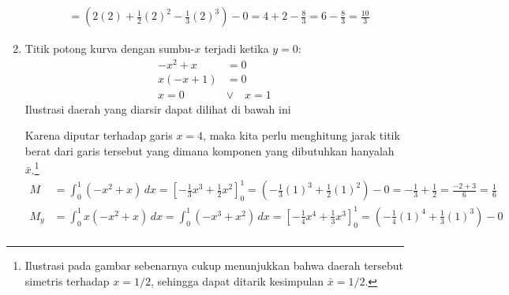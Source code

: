 \documentclass[11pt,openany,a4paper]{article}
\newcommand{\AxisRotator}[1][rotate=0]{%
    \tikz [x=0.25cm,y=0.60cm,line width=0.15ex,-stealth,#1,solid] \draw (0,0) arc (330:30:0.5 and 0.5);%
    }
\begin{document}
\begin{enumerate}
\begin{align*}
            &= \left( 2(2) + \frac{1}{2}(2)^2 - \frac{1}{3}(2)^3 \right) - 0 = 4 + 2 - \frac{8}{3} = 6 - \frac{8}{3} = \boxed{\frac{10}{3}}
        \end{align*}
        \item Titik potong kurva dengan sumbu-\( x \) terjadi ketika \( y = 0 \):
        \begin{align*}
            -x^2 + x &= 0 \\
            x(-x + 1) &= 0 \\
            x = 0 \quad&\vee\quad x = 1
        \end{align*}
        Ilustrasi daerah yang diarsir dapat dilihat di bawah ini
        \begin{center}
        \end{center}
        Karena diputar terhadap garis \( x = 4 \), maka kita perlu menghitung jarak titik berat dari garis tersebut yang dimana komponen yang dibutuhkan hanyalah \(\bar{x}\).\footnote{Ilustrasi pada gambar sebenarnya cukup menunjukkan bahwa daerah tersebut simetris terhadap $x=1/2$, sehingga dapat ditarik kesimpulan \(\bar{x} = 1/2\).}
        \begin{align*}
            M &= \int_{0}^{1} (-x^2+x) \, dx = \left[ -\frac{1}{3}x^3 + \frac{1}{2}x^2 \right]_{0}^{1} = \left( -\frac{1}{3}(1)^3 + \frac{1}{2}(1)^2 \right) - 0 = -\frac{1}{3} + \frac{1}{2} = \frac{-2+3}{6} = \frac{1}{6}\\
            M_y &= \int_{0}^{1} x(-x^2+x)\, dx = \int_{0}^{1} (-x^3+x^2) \, dx = \left[ -\frac{1}{4}x^4 + \frac{1}{3}x^3 \right]_{0}^{1} = \left( -\frac{1}{4}(1)^4 + \frac{1}{3}(1)^3 \right) - 0 \\

\end{align*}
\end{enumerate}
\end{document}
